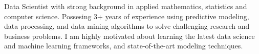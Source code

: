 

\begin{cvparagraph}


Data Scientist with strong background in applied mathematics, statistics and computer science. Possesing 
3+ years of experience using predictive modeling, data processing, and data mining algorithms to solve
challenging research and business problems. I am highly motivated about learning the
latest data science and machine learning frameworks, and state-of-the-art modeling techniques.

\end{cvparagraph}
